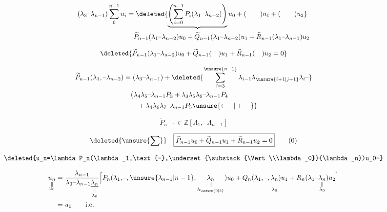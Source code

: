 {\scriptsize
\[
\begin{aligned}
(\lambda_3\text{--}\lambda_{n-1})\sum_0^{n-1}u_i
&=\deleted{\underbrace{\left(\sum_{i=0}^{n-1}P_i(\lambda_1\text{--}\lambda_{n-2})\right)}u_0+(\qquad)u_1+(\qquad)u_2}\\
&\quad\widetilde P_{n-1}(\lambda_1\text{--}\lambda_{n-2})u_0+
 \widetilde Q_{n-1}(\lambda_1\text{--}\lambda_{n-2})u_1+
 \widetilde R_{n-1}(\lambda_1\text{--}\lambda_{n-1})u_2
\end{aligned}
\]
}

\[
\deleted{\widetilde P_{n-1}(\lambda_1\text{--}\lambda_{n-2})u_0+
\widetilde Q_{n-1}(\quad)u_1+\widetilde R_{n-1}(\quad)u_2=0}
\]

\[
\begin{aligned}
\widetilde P_{n-1}(\lambda_1,\text{--}\lambda_{n-2}) &=
(\lambda_3\text{--}\lambda_{n-1})+
\deleted{\sum_{i=3}^{\unsure{n-1}}\lambda_{i-1}\lambda_{\unsure{i+1|j+1}}\lambda_{i}\text{--}}\\
&\quad\big(\lambda_4\lambda_5\text{--}\lambda_{n-1}P_3
 +\lambda_3\lambda_5\lambda_6\text{--}\lambda_{n-1}P_4\\
&\qquad+\lambda_{4}\lambda_6\lambda_7\text{--}\lambda_{n-1}P_5\unsure{\longleftarrow|+\text{---}}\big)
\end{aligned}
\]


\[
\widetilde P_{n-1}\in\mathbb Z[\Lambda_1,\text{--}\Lambda_{n-1}]
\]

\[
\deleted{\unsure{\sum}}\quad
\boxed{\widetilde P_{n-1}u_0+\widetilde Q_{n-1}u_1+\widetilde R_{n-1}u_2=0}\tag*{(0)}
\]

\endgroup


\begingroup
\makeatletter
\tagsleft@true
\makeatother

\[
\deleted{u_n=\lambda P_n(\lambda_1,\text{--},\underset{\substack{\Vert\\\lambda_0}}{\lambda_n})u_0+}
\]

{\scriptsize
\[
\begin{aligned}
\underset{\substack{\Vert\\u_0}}{u_n}
&=\frac{\lambda_{n-1}}{\lambda_3\text{--}\lambda_{n-1}\underset{\substack{\Vert\\\lambda_0}}{\underline{\lambda_n}}}
\Big[P_n(\lambda_1,\text{--},\unsure{\lambda_{n-1}|n-1},\underset{\substack{\Vert\\\lambda_{\unsure{0|3}}}}{\lambda_n})u_0+
Q_n(\lambda_1,\text{--},\underset{\substack{\Vert\\\lambda_0}}{\lambda_n})u_1+
R_n(\lambda_1\text{--}\underset{\substack{\Vert\\\lambda_0}}{\lambda_n})u_2\Big]\\
&=u_0\qquad \text{i.e.}
\end{aligned}
\]
}

